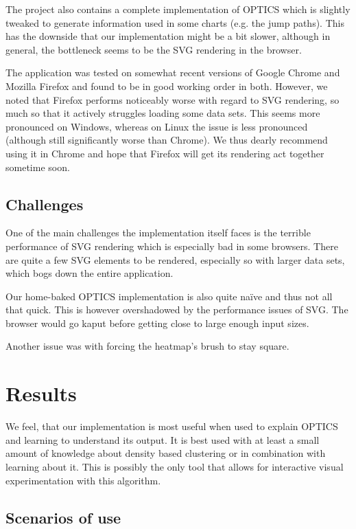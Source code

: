 \documentclass{vgtc} %
\begin{document}
The project also contains a complete implementation of OPTICS which is slightly tweaked to
generate information used in some charts (e.g. the jump paths). This has the downside
that our implementation might be a bit slower, although in general, the bottleneck seems
to be the SVG rendering in the browser.

The application was tested on somewhat recent versions of Google Chrome and Mozilla Firefox
and found to be in good working order in both. However, we noted that Firefox performs noticeably
worse with regard to SVG rendering, so much so that it actively struggles loading
some data sets. This seems more pronounced on Windows, whereas on Linux the issue is less pronounced
(although still significantly worse than Chrome). We thus dearly recommend using it in
Chrome and hope that Firefox will get its rendering act together sometime soon.

\subsection{Challenges}

One of the main challenges the implementation itself faces is the terrible performance
of SVG rendering which is especially bad in some browsers. There are quite a few SVG
elements to be rendered, especially so with larger data sets, which bogs down the entire
application.

Our home-baked OPTICS implementation is also quite na\"ive and thus not all
that quick. This is however overshadowed by the performance issues of SVG. The
browser would go kaput before getting close to large enough input sizes.

Another issue was with forcing the heatmap's brush to stay square.

\section{Results}

We feel, that our implementation\cite{Our_Implementation} is most useful when used to explain OPTICS and learning to understand its output. It is best used with at least a small amount of knowledge about density based clustering or in combination with learning about it. This is possibly the only tool that allows for interactive visual experimentation with this algorithm.

\subsection{Scenarios of use}
\end{document}
